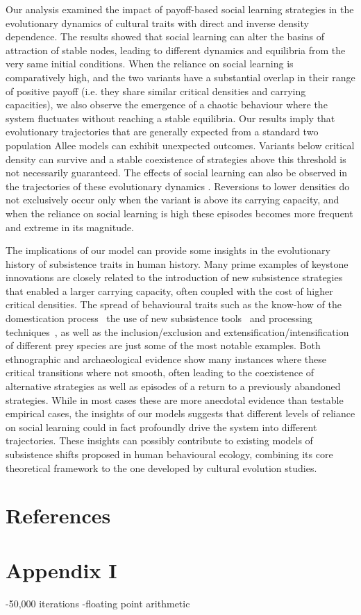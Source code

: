 \documentclass[3p,authoryear,twocolumn]{elsarticle} %
\begin{document}
Our analysis examined the impact of payoff-based social learning strategies in the evolutionary dynamics of cultural traits with direct and inverse density dependence. The results showed that social learning can alter the basins of attraction of stable nodes, leading to different dynamics and equilibria from the very same initial conditions. When the reliance on social learning is comparatively high, and  the two variants have a substantial overlap in their range of positive payoff (i.e. they share similar critical densities and carrying capacities), we also observe the emergence of a chaotic behaviour where the system fluctuates without reaching a stable equilibria. Our results imply that evolutionary trajectories that are generally expected from a standard two population Allee models can exhibit unexpected outcomes. Variants below critical density can survive and a stable coexistence of strategies above this threshold is not necessarily guaranteed. The effects of social learning can also be observed in the trajectories of these evolutionary dynamics . Reversions to lower densities do not exclusively occur only when the variant is above its carrying capacity, and when the reliance on social learning is high these episodes becomes more frequent and extreme in its magnitude. 


The implications of our model can provide some insights in the evolutionary history of subsistence traits in human history. Many prime examples of keystone innovations are closely related to the introduction of new subsistence strategies that enabled a larger carrying capacity, often coupled with the cost of higher critical densities. The spread of behavioural traits such as the know-how of the domestication process~\citep{barker2006} the use of new subsistence tools~\citep{petraglia_population_2009} and processing techniques~\citep{molleson1993}, as well as the inclusion/exclusion and extensification/intensification of different prey species are just some of the most notable examples. Both ethnographic and archaeological evidence show many instances where these critical transitions where not smooth, often leading to the coexistence of alternative strategies as well as episodes of a return to a previously abandoned strategies. %
While in most cases these are more anecdotal evidence than testable empirical cases, the insights of our models suggests that different levels of reliance on social learning could in fact profoundly drive the system into different trajectories.  These insights can possibly contribute to existing models of subsistence shifts proposed in human behavioural ecology\citep{smith1992,bird2006,kennett2006}, combining its core theoretical framework to the one developed by cultural evolution studies. 






\section{References}




\section{Appendix I}

-50,000 iterations
-floating point arithmetic
\end{document}
